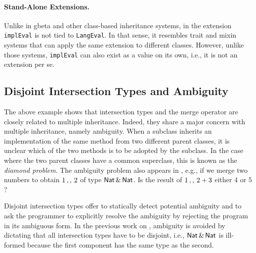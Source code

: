 \paragraph{Stand-Alone Extensions.}
Unlike in gbeta and other class-based inheritance systems, in \namee
the extension \lstinline{implEval} is not tied to \lstinline{LangEval}. In that
sense, it resembles trait and mixin systems that can apply the same extension
to different classes. However, unlike those systems, \lstinline{implEval} can also
exist as a value on its own, i.e., it is not an extension per se.

\subsection{Disjoint Intersection Types and Ambiguity}

The above example shows that intersection types and the merge operator
are closely related to multiple
inheritance. Indeed, they share a major concern with multiple inheritance,
namely ambiguity. When a subclass inherits an implementation of the same
method from two different parent classes, it is unclear which of the two
methods is to be adopted by the subclass. In the case where the two parent classes
have a common superclass, this is known as the \emph{diamond problem}.
The ambiguity problem also appears in \namee,
e.g., if we merge two numbers to obtain $1 \, ,, \, 2$ of type
$\mathsf{Nat} \,\&\, \mathsf{Nat}$. Is the result of $1 \, ,, \, 2 + 3$
either $4$ or $5$?

Disjoint intersection types offer to statically detect potential ambiguity and
to ask the programmer to explicitly resolve the ambiguity by rejecting the
program in its ambiguous form. In the previous work on \oname, ambiguity is
avoided by dictating that all intersection types have to be disjoint, i.e.,
$\mathsf{Nat} \,\&\, \mathsf{Nat}$ is ill-formed because the first component
has the same type as the second.

